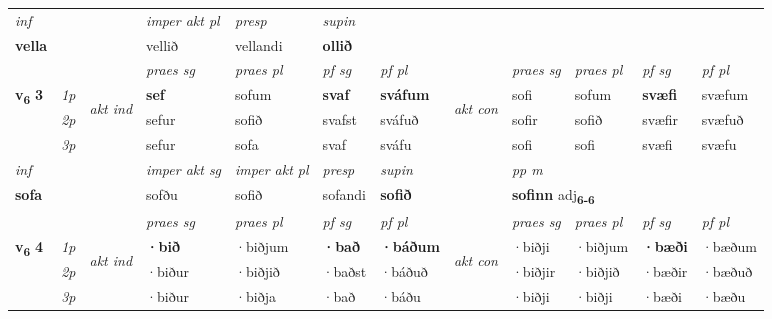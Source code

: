 \begin{longtable}[l]{X>{\footnotesize\itshape}llXXXXlXXXX}
   {\textit{inf}} & &  & \textit{imper akt pl}   & \textit{presp} & \textit{supin}   \\*
  {\textbf{vella}} & &  & vellið   & vellandi &  \textbf{ollið}   \\*

\midrule

 & &   & \textit{praes sg}  & \textit{praes pl}    & \textit{ pf sg} & \textit{pf pl} & & \textit{praes sg}  & \textit{praes pl}    & \textit{pf sg} & \textit{pf pl }  \\ \cmidrule{4-7} \cmidrule{9-12}
 \multirow{2}{*}{{{\textbf{v{\textsubscript{6}}} \Large{\textbf{3}}}}}  & 1p & \multirow{3}{*}{\begin{turn}{90}\textit{akt ind}\end{turn}} & \textbf{sef} & sofum & \textbf{svaf} & \textbf{sváfum} & \multirow{3}{*}{\begin{turn}{90}\textit{akt con}\end{turn}} &sofi & sofum & \textbf{svæfi} & svæfum\\*
 & 2p &  &  sefur  & sofið & svafst & sváfuð & & sofir & sofið & svæfir & svæfuð \\*
 & 3p &  & sefur & sofa & svaf & sváfu & & sofi & sofi& svæfi & svæfu \\*
\cmidrule{4-7} \cmidrule{9-12}

   {\textit{inf}} & &  & \textit{imper akt sg} & \textit{imper akt pl}   & \textit{presp} & \textit{supin}  && \textit{pp m} \\*
  {\textbf{sofa}} & && sofðu  & sofið   & sofandi &  \textbf{sofið}  && \multicolumn{2}{l}{\textbf{sofinn} adj\textbf{\textsubscript{6-6}}} \\*

\midrule

 & &   & \textit{praes sg}  & \textit{praes pl}    & \textit{ pf sg} & \textit{pf pl} & & \textit{praes sg}  & \textit{praes pl}    & \textit{pf sg} & \textit{pf pl }  \\ \cmidrule{4-7} \cmidrule{9-12}
 \multirow{2}{*}{{{\textbf{v{\textsubscript{6}}} \Large{\textbf{4}}}}}  & 1p & \multirow{3}{*}{\begin{turn}{90}\textit{akt ind}\end{turn}} & \textbf{·bið} & ·biðjum & \textbf{·bað} & \textbf{·báðum} & \multirow{3}{*}{\begin{turn}{90}\textit{akt con}\end{turn}} &·biðji & ·biðjum & \textbf{·bæði} & ·bæðum\\*
 & 2p &  &  ·biður  & ·biðjið & ·baðst & ·báðuð & & ·biðjir & ·biðjið & ·bæðir & ·bæðuð \\*
 & 3p &  & ·biður & ·biðja & ·bað & ·báðu & & ·biðji & ·biðji& ·bæði & ·bæðu \\*
\cmidrule{4-7} \cmidrule{9-12}


\end{longtable}
